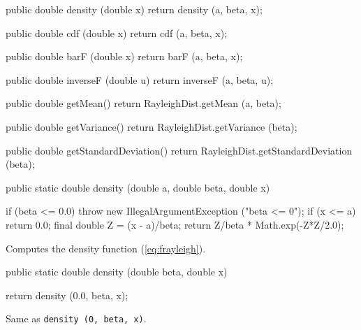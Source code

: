 \begin{code}\begin{hide}

   public double density (double x) {
      return density (a, beta, x);
   }

   public double cdf (double x) {
      return cdf (a, beta, x);
   }

   public double barF (double x) {
      return barF (a, beta, x);
   }

   public double inverseF (double u) {
      return inverseF (a, beta, u);
   }

   public double getMean() {
      return RayleighDist.getMean (a, beta);
   }

   public double getVariance() {
      return RayleighDist.getVariance (beta);
   }

   public double getStandardDeviation() {
      return RayleighDist.getStandardDeviation (beta);
   }\end{hide}

   public static double density (double a, double beta, double x)\begin{hide} {
      if (beta <= 0.0)
         throw new IllegalArgumentException ("beta <= 0");
      if (x <= a)
         return 0.0;
      final double Z = (x - a)/beta;
      return Z/beta * Math.exp(-Z*Z/2.0);
   }\end{hide}
\end{code}
\begin{tabb} Computes the density function (\ref{eq:frayleigh}).
\end{tabb}
\begin{htmlonly}
\end{htmlonly}
\begin{code}

   public static double density (double beta, double x)\begin{hide} {
      return density (0.0, beta, x);
   }\end{hide}
\end{code}
\begin{tabb} Same as \texttt{density (0, beta, x)}.
\end{tabb}
\begin{htmlonly}
\end{htmlonly}
